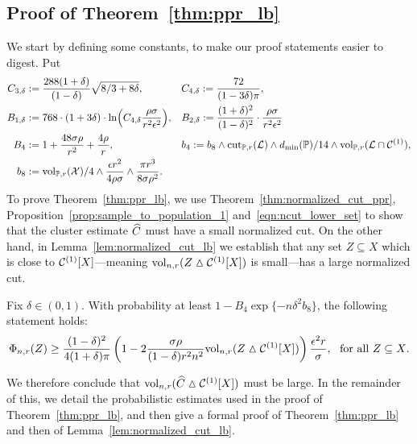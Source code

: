\subsection{Proof of Theorem~\ref{thm:ppr_lb}}
We start by defining some constants, to make our proof statements easier to digest. Put
\begin{align*}
C_{3,\delta} & := \frac{288(1 + \delta)}{(1 - \delta)} \sqrt{8/3 + 8 \delta}
,&&C_{4,\delta} := \frac{72}{(1 - 3\delta)\pi}, \\
B_{1,\delta} & := 768 \cdot (1 + 3\delta) \cdot \ln\Bigl(C_{4,\delta} \frac{\rho\sigma}{r^2 \epsilon^2} \Bigr),&&B_{2,\delta} := \frac{(1 + \delta)^2}{(1 - \delta)^2} \cdot \frac{\rho \sigma}{r^2 \epsilon^2} \\
B_4 & := 1 + \frac{48\sigma\rho}{r^2} + \frac{4\rho}{r},&&b_4 :=  b_8 \wedge \mathrm{cut}_{\mathbb{P},r}(\mathcal{L}) \wedge d_{\min}(\mathbb{P})/14 \wedge \mathrm{vol}_{\mathbb{P},r}(\mathcal{L} \cap \mathcal{C}^{(1)}), \\
b_8 &:= \mathrm{vol}_{\mathbb{P},r}(\mathcal{X})/4 \wedge \frac{\epsilon r^2}{4\rho\sigma} \wedge \frac{\pi r^3}{8\sigma \rho^2}.
\end{align*}
To prove Theorem~\ref{thm:ppr_lb}, we use Theorem~\ref{thm:normalized_cut_ppr}, Proposition~\ref{prop:sample_to_population_1} and~\eqref{eqn:ncut_lower_set} to show that the cluster estimate $\widehat{C}$ must have a small normalized cut. On the other hand, in Lemma~\ref{lem:normalized_cut_lb} we establish that any set $Z \subseteq X$ which is close to $\mathcal{C}^{(1)}[X]$---meaning $\mathrm{vol}_{n,r}(Z \vartriangle \mathcal{C}^{(1)}[X])$ is small---has a large normalized cut.
\begin{lemma}
	\label{lem:normalized_cut_lb}
	Fix $\delta \in (0,1)$. With probability at least $1 - B_4\exp\{-n\delta^2b_8\}$, the following statement holds:
	\begin{equation}
	\label{eqn:normalized_cut_lb}
	\Phi_{n,r}(Z) \geq \frac{(1 - \delta)^2}{4(1 + \delta)\pi} \left(1 - 2 \frac{\sigma \rho}{(1 - \delta) r^2 n^2} \mathrm{vol}_{n,r}(Z \vartriangle \mathcal{C}^{(1)}[X]) \right) \frac{\epsilon^2 r}{\sigma},~~\textrm{for all $Z \subseteq X$}.
	\end{equation}
\end{lemma}
We therefore conclude that $\mathrm{vol}_{n,r}(\widehat{C} \vartriangle \mathcal{C}^{(1)}[X])$ must be large. In the remainder of this, we detail the probabilistic estimates used in the proof of Theorem~\ref{thm:ppr_lb}, and then give a formal proof of Theorem~\ref{thm:ppr_lb} and then of Lemma~\ref{lem:normalized_cut_lb}.

